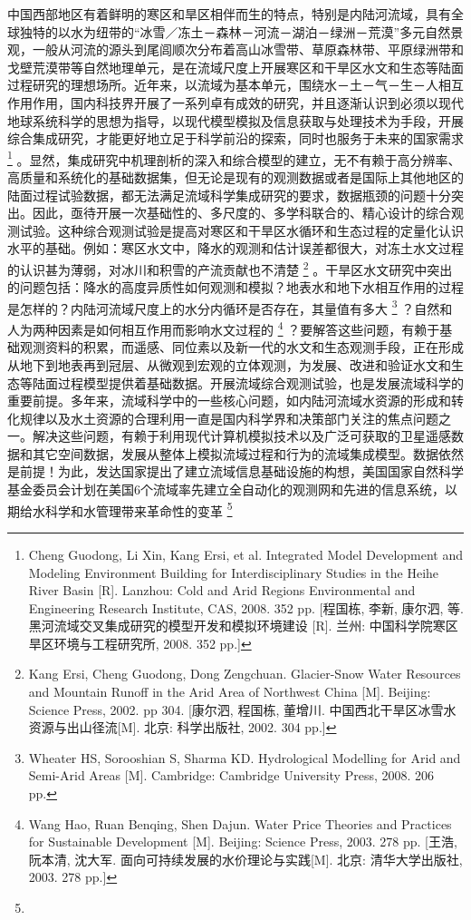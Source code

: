 \documentclass[letterpaper,10pt,english]{sphinxmanual}
\begin{document}
中国西部地区有着鲜明的寒区和旱区相伴而生的特点，特别是内陆河流域，具有全球独特的以水为纽带的“冰雪／冻土－森林－河流－湖泊－绿洲－荒漠”多元自然景观，一般从河流的源头到尾闾顺次分布着高山冰雪带、草原森林带、平原绿洲带和戈壁荒漠带等自然地理单元，是在流域尺度上开展寒区和干旱区水文和生态等陆面过程研究的理想场所。近年来，以流域为基本单元，围绕水－土－气－生－人相互作用作用，国内科技界开展了一系列卓有成效的研究，并且逐渐认识到必须以现代地球系统科学的思想为指导，以现代模型模拟及信息获取与处理技术为手段，开展综合集成研究，才能更好地立足于科学前沿的探索，同时也服务于未来的国家需求 \footnote{
Cheng Guodong, Li Xin, Kang Ersi, et al. Integrated Model Development and Modeling Environment Building for Interdisciplinary Studies in the Heihe River Basin {[}R{]}. Lanzhou: Cold and Arid Regions Environmental and Engineering Research Institute, CAS, 2008. 352 pp. {[}程国栋, 李新, 康尔泗, 等. 黑河流域交叉集成研究的模型开发和模拟环境建设 {[}R{]}. 兰州: 中国科学院寒区旱区环境与工程研究所, 2008. 352 pp.{]}
} 。显然，集成研究中机理剖析的深入和综合模型的建立，无不有赖于高分辨率、高质量和系统化的基础数据集，但无论是现有的观测数据或者是国际上其他地区的陆面过程试验数据，都无法满足流域科学集成研究的要求，数据瓶颈的问题十分突出。因此，亟待开展一次基础性的、多尺度的、多学科联合的、精心设计的综合观测试验。这种综合观测试验是提高对寒区和干旱区水循环和生态过程的定量化认识水平的基础。例如：寒区水文中，降水的观测和估计误差都很大，对冻土水文过程的认识甚为薄弱，对冰川和积雪的产流贡献也不清楚 \footnote{
Kang Ersi, Cheng Guodong, Dong Zengchuan. Glacier-Snow Water Resources and Mountain Runoff in the Arid Area of Northwest China {[}M{]}. Beijing: Science Press, 2002. pp 304. {[}康尔泗, 程国栋, 董增川. 中国西北干旱区冰雪水资源与出山径流{[}M{]}. 北京: 科学出版社, 2002. 304 pp.{]}
} 。干旱区水文研究中突出的问题包括：降水的高度异质性如何观测和模拟？地表水和地下水相互作用的过程是怎样的？内陆河流域尺度上的水分内循环是否存在，其量值有多大 \footnote{
Wheater HS, Sorooshian S, Sharma KD. Hydrological Modelling for Arid and Semi-Arid Areas {[}M{]}. Cambridge:  Cambridge University Press, 2008. 206 pp.
} ？自然和人为两种因素是如何相互作用而影响水文过程的 \footnote{
Wang Hao, Ruan Benqing, Shen Dajun. Water Price Theories and Practices for Sustainable Development {[}M{]}. Beijing: Science Press, 2003. 278 pp. {[}王浩, 阮本清, 沈大军. 面向可持续发展的水价理论与实践{[}M{]}. 北京: 清华大学出版社, 2003. 278 pp.{]}
} ？要解答这些问题，有赖于基础观测资料的积累，而遥感、同位素以及新一代的水文和生态观测手段，正在形成从地下到地表再到冠层、从微观到宏观的立体观测，为发展、改进和验证水文和生态等陆面过程模型提供着基础数据。开展流域综合观测试验，也是发展流域科学的重要前提。多年来，流域科学中的一些核心问题，如内陆河流域水资源的形成和转化规律以及水土资源的合理利用一直是国内科学界和决策部门关注的焦点问题之一。解决这些问题，有赖于利用现代计算机模拟技术以及广泛可获取的卫星遥感数据和其它空间数据，发展从整体上模拟流域过程和行为的流域集成模型。数据依然是前提！为此，发达国家提出了建立流域信息基础设施的构想，美国国家自然科学基金委员会计划在美国6个流域率先建立全自动化的观测网和先进的信息系统，以期给水科学和水管理带来革命性的变革 \footnote{
}
\end{document}
